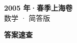 \documentclass[zihao=-4, a4paper]{ctexart}
\begin{document}
\begin{center}
  {\Large\bfseries 2005 年·春季上海卷}\\[4pt]
  {\large 数学 · 简答版}
\end{center}
\medskip
{}

\clearpage
{}
\begin{center}{\Large\bfseries 答案速查}\end{center}
\medskip

\end{document}
